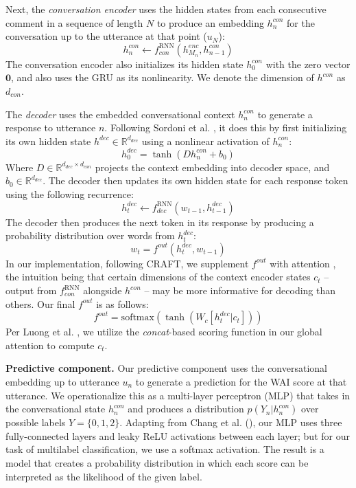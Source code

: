 \documentclass{article}
\begin{document}
Next, the \textit{conversation encoder} uses the hidden states from each consecutive comment in a sequence of length $N$ to produce an embedding $h^{con}_n$ for the conversation up to the utterance at that point ($u_N$):
\begin{equation}
  h^{con}_n \gets f^{\mathrm{RNN}}_{con}(h^{enc}_{M_n}, h^{con}_{n-1})
\end{equation}
The conversation encoder also initializes its hidden state $h^{con}_0$ with the zero vector $\mathbf{0}$, and also uses the GRU as its nonlinearity. We denote the dimension of $h^{con}$ as $d_{con}$.

The \textit{decoder} uses the embedded conversational context $h^{con}_n$ to generate a response to utterance $n$. Following Sordoni et al. \citeyear{sordoni2015hierarchical}, it does this by first initializing its own hidden state $h^{dec} \in \mathbb{R}^{d_{dec}}$ using a nonlinear activation of $h^{con}_n$:
\begin{equation}
  h^{dec}_0 = \tanh(D h^{con}_n + b_0)
\end{equation}
Where $D \in \mathbb{R}^{d_{dec} \times d_{con}}$ projects the context embedding into decoder space, and $b_0 \in \mathbb{R}^{d_{dec}}$. 
The decoder then updates its own hidden state for each response token using the following recurrence:
\begin{equation}
  h^{dec}_{t} \gets f^{\mathrm{RNN}}_{dec}(w_{t-1}, h^{dec}_{t-1})
\end{equation}
The decoder then produces the next token in its response by producing a probability distribution over words from $h^{dec}_t$:
\begin{equation}
  w_t = f^{out}(h^{dec}_t, w_{t-1})
\end{equation}
In our implementation, following CRAFT, we supplement $f^{out}$ with attention \cite{luong2015effective}, the intuition being that certain dimensions of the context encoder states $c_t$ -- output from $f^{\mathrm{RNN}}_{con}$ alongside $h^{con}$ -- may be more informative for decoding than others. Our final $f^{out}$ is as follows:
\begin{equation}
  f^{out} = \mbox{softmax}(\tanh(W_c [h^{dec}_t|c_t]))
\end{equation}
Per Luong et al. \citeyear{luong2015effective}, we utilize the \textit{concat}-based scoring function in our global attention to compute $c_t$.

\textbf{Predictive component.} Our predictive component uses the conversational embedding up to utterance $u_n$ to generate a prediction for the WAI score at that utterance. We operationalize this as a multi-layer perceptron (MLP) that takes in the conversational state $h^{con}_n$ and produces a distribution $p(Y_n|h^{con}_n)$ over possible labels $Y=\{0,1,2\}$. Adapting from Chang et al. (\citeyear{Chang-Trouble:19}), our MLP uses three fully-connected layers and leaky ReLU activations between each layer; but for our task of multilabel classification, we use a softmax activation. The result is a model that creates a probability distribution in which each score can be interpreted as the likelihood of the given label.
\end{document}
